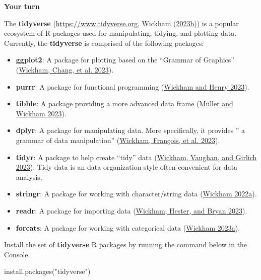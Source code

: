 \documentclass[
]{book}
\newenvironment{Shaded}{\begin{snugshade}}{\end{snugshade}}
\newcommand{\FunctionTok}[1]{\textcolor[rgb]{0.00,0.00,0.00}{#1}}
\newcommand{\NormalTok}[1]{#1}
\newcommand{\StringTok}[1]{\textcolor[rgb]{0.31,0.60,0.02}{#1}}
\providecommand{\tightlist}{%
  \setlength{\itemsep}{0pt}\setlength{\parskip}{0pt}}
\theoremstyle{definition}
\theoremstyle{definition}
\theoremstyle{definition}
\theoremstyle{definition}
\theoremstyle{remark}
\begin{document}
\begin{yourturn}

\textbf{Your turn}

The \textbf{tidyverse} (\url{https://www.tidyverse.org}, Wickham (\protect\hyperlink{ref-R-tidyverse}{2023b})) is a popular ecosystem of R packages used for manipulating, tidying, and plotting data. Currently, the \textbf{tidyverse} is comprised of the following packages:

\begin{itemize}
\tightlist
\item
  \textbf{ggplot2}: A package for plotting based on the ``Grammar of Graphics'' (\protect\hyperlink{ref-R-ggplot2}{Wickham, Chang, et al. 2023}).
\item
  \textbf{purrr}: A package for functional programming (\protect\hyperlink{ref-R-purrr}{Wickham and Henry 2023}).
\item
  \textbf{tibble}: A package providing a more advanced data frame (\protect\hyperlink{ref-R-tibble}{Müller and Wickham 2023}).
\item
  \textbf{dplyr}: A package for manipulating data. More specifically, it provides '' a grammar of data manipulation'' (\protect\hyperlink{ref-R-dplyr}{Wickham, François, et al. 2023}).
\item
  \textbf{tidyr}: A package to help create ``tidy'' data (\protect\hyperlink{ref-R-tidyr}{Wickham, Vaughan, and Girlich 2023}). Tidy data is an data organization style often convenient for data analysis.
\item
  \textbf{stringr}: A package for working with character/string data (\protect\hyperlink{ref-R-stringr}{Wickham 2022a}).
\item
  \textbf{readr}: A package for importing data (\protect\hyperlink{ref-R-readr}{Wickham, Hester, and Bryan 2023}).
\item
  \textbf{forcats}: A package for working with categorical data (\protect\hyperlink{ref-R-forcats}{Wickham 2023a}).
\end{itemize}

Install the set of \textbf{tidyverse} R packages by running the command below in the Console.

\begin{Shaded}
\begin{Highlighting}[]
\FunctionTok{install.packages}\NormalTok{(}\StringTok{"tidyverse"}\NormalTok{)}
\end{Highlighting}
\end{Shaded}


\end{yourturn}
\end{document}

